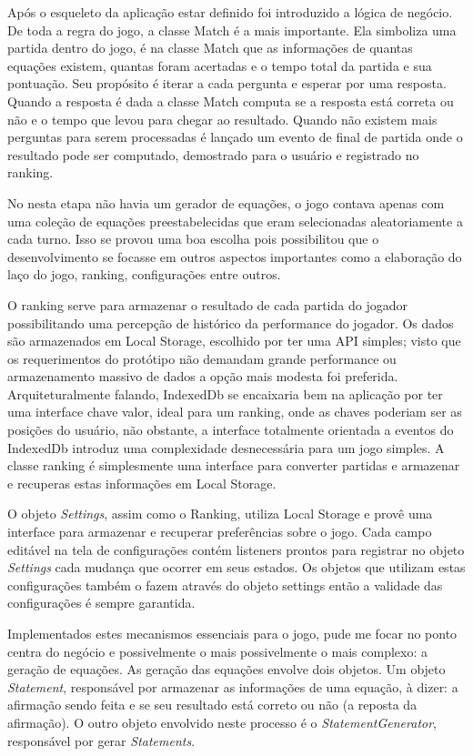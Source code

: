 \begin{draft}
Após o esqueleto da aplicação estar definido foi introduzido a lógica de negócio.
De toda a regra do jogo, a classe Match é a mais importante.
Ela simboliza uma partida dentro do jogo, é na classe Match que 
as informações de quantas equações existem, quantas foram acertadas
e o tempo total da partida e sua pontuação. Seu propósito é iterar 
a cada pergunta e esperar por uma resposta. Quando a resposta é dada
a classe Match computa se a resposta está correta ou não e o tempo 
que levou para chegar ao resultado. Quando não existem mais perguntas 
para serem processadas é lançado um evento de final de partida onde 
o resultado pode ser computado, demostrado para o usuário e registrado 
no ranking.

No nesta etapa não havia um gerador de equações, o jogo
contava apenas com uma coleção de equações preestabelecidas que eram
selecionadas aleatoriamente a cada turno. Isso se provou uma boa escolha
pois possibilitou que o desenvolvimento se focasse em outros aspectos
importantes como a elaboração do laço do jogo, ranking, configurações entre outros.

O ranking serve para armazenar o resultado de cada partida do jogador
possibilitando uma percepção de histórico da performance do jogador.
Os dados são armazenados em Local Storage, escolhido por
ter uma API simples; visto que os requerimentos do protótipo não
demandam grande performance ou armazenamento massivo de dados a opção
mais modesta foi preferida. Arquiteturalmente falando, IndexedDb se
encaixaria bem na aplicação por ter uma interface chave valor,
ideal para um ranking, onde as chaves poderiam ser as posições do usuário,
não obstante, a interface totalmente orientada a eventos do IndexedDb
introduz uma complexidade desnecessária para um jogo simples.
A classe ranking é simplesmente uma interface para converter partidas e armazenar
e recuperas estas informações em Local Storage.

O objeto \textit{Settings}, assim como o Ranking, utiliza Local Storage
e provê uma interface para armazenar e recuperar preferências sobre o jogo.
Cada campo editável na tela de configurações contém listeners prontos
para registrar no objeto \textit{Settings} cada mudança que ocorrer em seus estados.
Os objetos que utilizam estas configurações também o fazem através do objeto settings
então a validade das configurações é sempre garantida.

Implementados estes mecanismos essenciais para o jogo, pude me focar no
ponto centra do negócio e possivelmente o mais possivelmente o mais
complexo: a geração de equações. As geração das equações envolve
dois objetos. Um objeto \textit{Statement}, responsável por armazenar
as informações de uma equação, à dizer: a afirmação sendo feita e
se seu resultado está correto ou não (a reposta da afirmação).
O outro objeto envolvido neste processo é o \textit{StatementGenerator},
responsável por gerar \textit{Statements}.


\end{draft}
